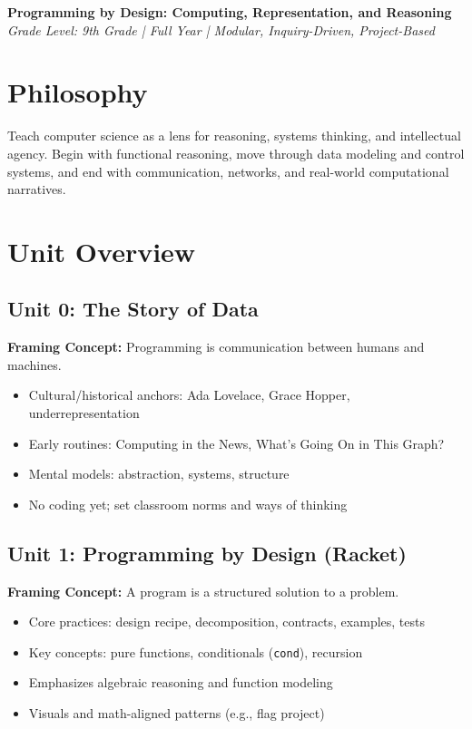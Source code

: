 \documentclass[11pt]{article}
\begin{document}
\begin{center}
  {\LARGE \textbf{Programming by Design: Computing, Representation, and Reasoning}}\\[0.5em]
  \textit{Grade Level: 9th Grade \quad | \quad Full Year \quad | \quad Modular, Inquiry-Driven, Project-Based}
\end{center}

\section*{Philosophy}
Teach computer science as a lens for reasoning, systems thinking, and intellectual agency. Begin with functional reasoning, move through data modeling and control systems, and end with communication, networks, and real-world computational narratives.

\section*{Unit Overview}

\subsection*{Unit 0: The Story of Data}
\textbf{Framing Concept:} Programming is communication between humans and machines.
\begin{itemize}[leftmargin=*]
  \item Cultural/historical anchors: Ada Lovelace, Grace Hopper, underrepresentation
  \item Early routines: Computing in the News, What's Going On in This Graph?
  \item Mental models: abstraction, systems, structure
  \item No coding yet; set classroom norms and ways of thinking
\end{itemize}

\subsection*{Unit 1: Programming by Design (Racket)}
\textbf{Framing Concept:} A program is a structured solution to a problem.
\begin{itemize}[leftmargin=*]
  \item Core practices: design recipe, decomposition, contracts, examples, tests
  \item Key concepts: pure functions, conditionals (\texttt{cond}), recursion
  \item Emphasizes algebraic reasoning and function modeling
  \item Visuals and math-aligned patterns (e.g., flag project)
\end{itemize}
\end{document}
